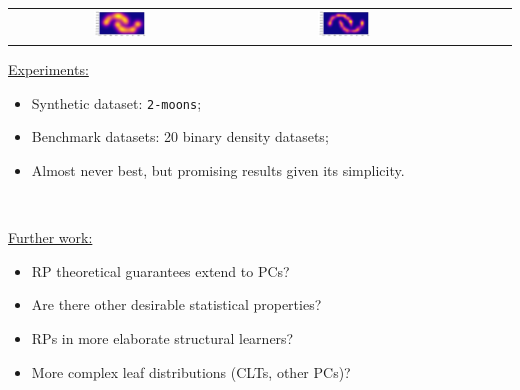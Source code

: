 \documentclass[14pt]{ffslides}
\begin{document}
\begin{minipage}{0.495\textwidth}
\begin{center}
{\begin{tabular}{c|ccccc}
  \includegraphics[width=0.245\textwidth]{figures/online_gauss005_moons_density_max.pdf} &
  \includegraphics[width=0.245\textwidth]{figures/online_gauss001_moons_density_max.pdf}
\end{tabular}
}
\end{center}
\end{minipage}

\begin{center}
\begin{minipage}{0.45\textwidth}
\colorbox{pyellow}{\underline{Experiments:}}
\begin{itemize}\itemsep0pt
  \item Synthetic dataset: \texttt{2-moons};
  \item Benchmark datasets: 20 binary density datasets;
  \item Almost never best, but promising results given its simplicity.
\end{itemize}
\end{minipage}~\begin{minipage}{0.45\textwidth}
\vskip 0.5cm
\colorbox{pyellow}{\underline{Further work:}}
\begin{itemize}\itemsep0pt
  \item RP theoretical guarantees extend to PCs?
  \item Are there other desirable statistical properties?
  \item RPs in more elaborate structural learners?
  \item More complex leaf distributions (CLTs, other PCs)?
\end{itemize}
\end{minipage}
\end{center}

\vskip 0.5cm
\hspace{2cm}\textcolor{gray}{\cite{gens13,mei20,liang17,dimauro21}}
\vskip 1.0cm
\end{document}
